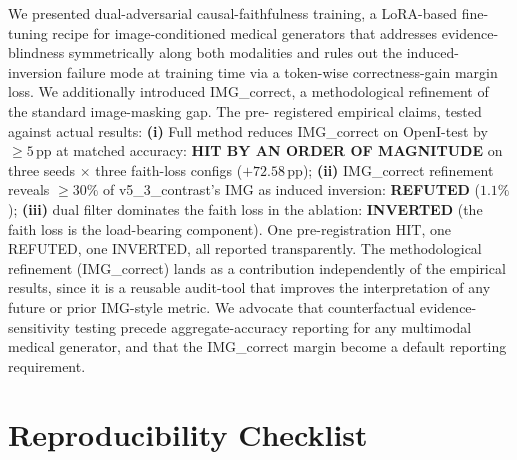 \documentclass{article}
\begin{document}
We presented dual-adversarial causal-faithfulness training, a LoRA-based
fine-tuning recipe for image-conditioned medical generators that addresses
evidence-blindness symmetrically along both modalities and rules out the
induced-inversion failure mode at training time via a token-wise
correctness-gain margin loss. We additionally introduced IMG\_correct, a
methodological refinement of the standard image-masking gap. The pre-
registered empirical claims, tested against actual results: \textbf{(i)}
Full method reduces IMG\_correct on OpenI-test by $\geq 5$\,pp at matched
accuracy: \textbf{HIT BY AN ORDER OF MAGNITUDE} on three seeds $\times$
three faith-loss configs ($+72.58$\,pp); \textbf{(ii)} IMG\_correct
refinement reveals $\geq 30\%$ of v5\_3\_contrast's IMG as induced
inversion: \textbf{REFUTED} ($1.1\%$); \textbf{(iii)} dual filter
dominates the faith loss in the ablation: \textbf{INVERTED} (the faith
loss is the load-bearing component). One pre-registration HIT, one
REFUTED, one INVERTED, all reported transparently. The methodological
refinement (IMG\_correct) lands as a contribution independently of the
empirical results, since it is a reusable audit-tool that improves the
interpretation of any future or prior IMG-style metric. We advocate that
counterfactual evidence-sensitivity testing precede aggregate-accuracy
reporting for any multimodal medical generator, and that the IMG\_correct
margin become a default reporting requirement.




\appendix

\section{Reproducibility Checklist}
\label{app:repro}
\end{document}
